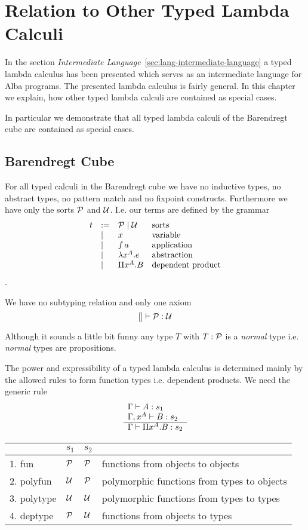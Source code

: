 \section{Relation to Other Typed Lambda Calculi}
\label{sec:lang-other-typed}


In the section \emph{Intermediate
  Language}~\ref{sec:lang-intermediate-language} a typed lambda calculus has
been presented which serves as an intermediate language for Alba programs. The
presented lambda calculus is fairly general. In this chapter we explain, how
other typed lambda calculi are contained as special cases.

In particular we demonstrate that all typed lambda calculi of the Barendregt
cube are contained as special cases.


\subsection{Barendregt Cube}

For all typed calculi in the Barendregt cube we have no inductive types, no
abstract types, no pattern match and no fixpoint constructs. Furthermore we
have only the sorts ${\cal{P}}$ and ${\cal{U}}$. I.e. our terms
are defined by the grammar
$$
\begin{array}{lllll}
  t &:= & {\cal{P}} \mid {\cal{U}}  & \text{sorts}
  \\
    & \mid & x & \text{variable}
  \\
    & \mid & f \, a & \text{application}
  \\
    & \mid & \lambda x^A. e & \text{abstraction}
  \\
    & \mid & \Pi x^A.B & \text{dependent product}
\end{array}
$$.

We have no subtyping relation and only one axiom
$$
 [] \vdash {\cal{P}} : {\cal{U}}
$$

Although it sounds a little bit funny any type $T$ with $ T : {\cal{P}}$ is a
\emph{normal} type i.e. \emph{normal} types are propositions.

The power and expressibility of a typed lambda calculus is determined mainly
by the allowed rules to form function types i.e. dependent products. We need
the generic rule
$$
\begin{array}{l} 
  \Gamma \vdash A : s_1
  \\
  \Gamma, x^A \vdash B : s_2
 \\ \hline  \Gamma \vdash \Pi x^A . B : s_2\end{array}
$$

\begin{tabular}{| l | l | l | l |}
  \hline
  & $s_1$ & $s_2$ &
  \\
  \hline
  1. fun       & ${\cal{P}}$ & ${\cal{P}}$ & functions from objects to objects
  \\
  2. polyfun   & ${\cal{U}}$  & ${\cal{P}}$ & polymorphic functions from types to objects
  \\
  3. polytype  & ${\cal{U}}$  & ${\cal{U}}$  & polymorphic functions from types to types
  \\
  4. deptype   & ${\cal{P}}$ & ${\cal{U}}$  & functions from objects to types
  \\
  \hline
\end{tabular}

